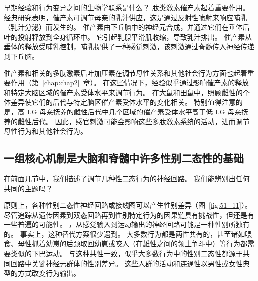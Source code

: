 早期经验和行为变异之间的生物学联系是什么？
肽类激素催产素起着重要作用。
经典研究表明，催产素可调节母亲的乳汁供应，这是通过反射性喷射来响应哺乳（乳汁分泌）而发生的。
催产素由下丘脑中的神经元合成，并通过它们在垂体后叶的投射释放到全身循环中。
它引起乳腺平滑肌收缩，导致乳汁排出。
催产素从垂体的释放受哺乳控制，哺乳提供了一种感觉刺激，该刺激通过脊髓传入神经传递到下丘脑。


催产素和相关的多肽激素后叶加压素在调节母性关系和其他社会行为方面也起着重要作用（第~\ref{chap:chap2}~章）。
在这些情况下，经验似乎通过影响催产素的释放和特定大脑区域的催产素受体水平来调节行为。
在大鼠和田鼠中，照顾雌性的个体差异使它们的后代与特定脑区催产素受体水平的变化相关。
特别值得注意的是，高 LG 母亲抚养的雌性后代中几个区域的催产素受体水平高于低 LG 母亲抚养的雌性后代。
因此，感官刺激可能会影响这些多肽激素系统的活动，进而调节母性行为和其他社会行为。



\subsection{一组核心机制是大脑和脊髓中许多性别二态性的基础}

在前面几节中，我们描述了调节几种性二态行为的神经回路。
我们能辨别出任何共同的主题吗？


原则上，各种性别二态性神经回路或接线图可以产生性别差异（图~\ref{fig:51_11}）。
尽管追踪从遗传因素到双态回路再到性别特定行为的因果链具有挑战性，但还是有一些普遍的可能性。 
，从感觉输入到运动输出的神经回路可能是一种性别所独有的。
事实上，这种替代方案很少遇到。
大多数行为都是两性共有的，甚至诸如喂食、母性抓着幼崽的后颈取回幼崽或咬人（在雄性之间的领土争斗中）等行为都需要类似的下巴运动。
与这种共性一致，似乎大多数行为中的性别二态性都源于共同回路中关键神经元群体的性别差异。
这些人群的活动和连通性以男性或女性典型的方式改变行为输出。


